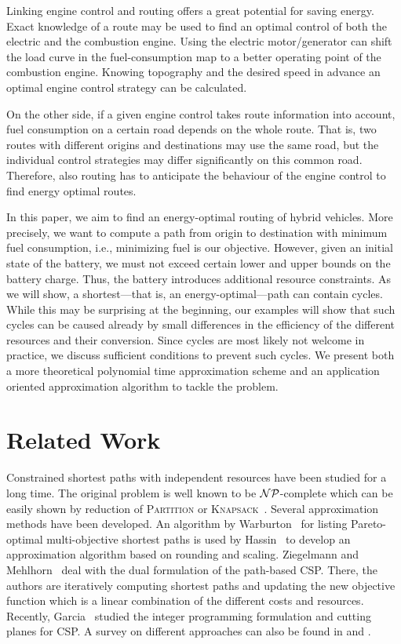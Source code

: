\documentclass[a4paper]{scrartcl}
\begin{document}
Linking engine control and routing offers a great potential for saving energy. Exact knowledge of a route may be used to find an optimal control of both the electric and the combustion engine. Using the electric motor/generator can shift the load curve in the fuel-consumption map to a better operating point of the combustion engine. Knowing topography and the desired speed in advance an optimal engine control strategy can be calculated.  

On the other side, if a given engine control takes route information into account, fuel consumption on a certain road depends on the whole route. That is, two routes with different origins and destinations may use the same road, but the individual control strategies may differ significantly on this common road. Therefore, also routing has to anticipate the behaviour of the engine control to find energy optimal routes.


In this paper, we aim to find an energy-optimal routing of hybrid vehicles. More precisely, we want to compute a path from origin to destination with minimum fuel consumption, i.e., minimizing fuel is our objective. However, given an initial state of the battery, we must not exceed certain lower and upper bounds on the battery charge. Thus, the battery introduces additional resource constraints. As we will show, a shortest---that is, an energy-optimal---path can contain cycles. While this may be surprising at the beginning, our examples will show that such cycles can be caused already by small differences in the efficiency of the different resources and their conversion. Since cycles are most likely not welcome in practice, we discuss sufficient conditions to prevent such cycles. We present both a more theoretical polynomial time approximation scheme and an application oriented approximation algorithm to tackle the problem. 

\section{Related Work}

Constrained shortest paths with independent resources have been studied for a long time. The original problem is well known to be $\cal NP$-complete which can be easily shown by reduction of \textsc{Partition} or \textsc{Knapsack}~\cite{Johnson_complexity}. Several approximation methods have been developed.  An algorithm by Warburton~\cite{war87} for listing Pareto-optimal multi-objective shortest paths is used by Hassin~\cite{Hassin} to develop an approximation algorithm based on rounding and scaling. Ziegelmann and Mehlhorn~\cite{Ziegelmann+Mehlhorn_CSP, Ziegelmann_CSP} deal with the dual formulation of the path-based CSP. There, the authors are iteratively computing shortest paths and updating the new objective function which is a linear combination of the different costs and resources. Recently, Garcia~\cite{Garcia_CSP} studied the integer programming formulation and cutting planes for CSP. A survey on different approaches can also be found in \cite{Garcia_CSP} and \cite{Ziegelmann_CSP}.
\end{document}
